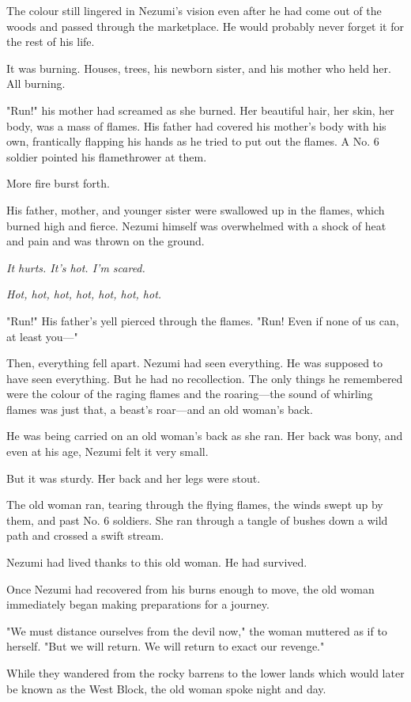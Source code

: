 The colour still lingered in Nezumi's vision even after he had come out
of the woods and passed through the marketplace. He would probably never
forget it for the rest of his life.

It was burning. Houses, trees, his newborn sister, and his mother who
held her. All burning.

"Run!" his mother had screamed as she burned. Her beautiful hair, her
skin, her body, was a mass of flames. His father had covered his
mother's body with his own, frantically flapping his hands as he tried
to put out the flames. A No. 6 soldier pointed his flamethrower at them.

More fire burst forth.

His father, mother, and younger sister were swallowed up in the flames,
which burned high and fierce. Nezumi himself was overwhelmed with a
shock of heat and pain and was thrown on the ground.

\emph{It hurts. It's hot. I'm scared.}

\emph{Hot, hot, hot, hot, hot, hot, hot.}

"Run!" His father's yell pierced through the flames. "Run! Even if none
of us can, at least you---"

Then, everything fell apart. Nezumi had seen everything. He was supposed
to have seen everything. But he had no recollection. The only things he
remembered were the colour of the raging flames and the roaring---the
sound of whirling flames was just that, a beast's roar---and an old
woman's back.

He was being carried on an old woman's back as she ran. Her back was
bony, and even at his age, Nezumi felt it very small.~

But it was sturdy. Her back and her legs were stout.

The old woman ran, tearing through the flying flames, the winds swept up
by them, and past No. 6 soldiers. She ran through a tangle of bushes
down a wild path and crossed a swift stream.

Nezumi had lived thanks to this old woman. He had survived.

Once Nezumi had recovered from his burns enough to move, the old woman
immediately began making preparations for a journey.

"We must distance ourselves from the devil now," the woman muttered as
if to herself. "But we will return. We will return to exact our
revenge."

While they wandered from the rocky barrens to the lower lands which
would later be known as the West Block, the old woman spoke night and
day.

